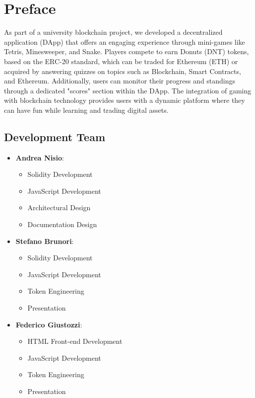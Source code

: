\documentclass[../main.tex]{subfiles}
\begin{document}
\section{Preface}\label{sec:introduction}
As part of a university blockchain project, we developed a decentralized application (DApp) that offers an engaging experience through mini-games like Tetris, Minesweeper, and Snake. Players compete to earn Donuts (DNT) tokens, based on the ERC-20 standard, which can be traded for Ethereum (ETH) or acquired by answering quizzes on topics such as Blockchain, Smart Contracts, and Ethereum. Additionally, users can monitor their progress and standings through a dedicated "scores" section within the DApp. The integration of gaming with blockchain technology provides users with a dynamic platform where they can have fun while learning and trading digital assets.

\subsection{Development Team}

\begin{itemize}
    \item \textbf{Andrea Nisio}: 
    \begin{itemize}
        \item Solidity Development
        \item JavaScript Development
        \item Architectural Design
        \item Documentation Design
    \end{itemize}
    
    \item \textbf{Stefano Brunori}: 
    \begin{itemize}
        \item Solidity Development
        \item JavaScript Development
        \item Token Engineering
        \item Presentation
    \end{itemize}
    
    \item \textbf{Federico Giustozzi}: 
    \begin{itemize}
        \item HTML Front-end Development
        \item JavaScript Development
        \item Token Engineering
        \item Presentation
    \end{itemize}
\end{itemize}
\end{document}
